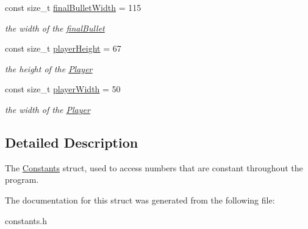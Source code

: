 \begin{DoxyCompactItemize}
\mbox{\label{structConstants_a5f71dc635e410b31e4876e97e46b1c20}} 
const size\+\_\+t \hyperlink{structConstants_a5f71dc635e410b31e4876e97e46b1c20}{final\+Bullet\+Width} = 115
\begin{DoxyCompactList}\small\item\em the width of the \hyperlink{classfinalBullet}{final\+Bullet} \end{DoxyCompactList}\item 
\mbox{\label{structConstants_a9f635dc83697b9a825959384b61cc559}} 
const size\+\_\+t \hyperlink{structConstants_a9f635dc83697b9a825959384b61cc559}{player\+Height} = 67
\begin{DoxyCompactList}\small\item\em the height of the \hyperlink{classPlayer}{Player} \end{DoxyCompactList}\item 
\mbox{\label{structConstants_a9854eedbfb70239ffbd1d12530f301a5}} 
const size\+\_\+t \hyperlink{structConstants_a9854eedbfb70239ffbd1d12530f301a5}{player\+Width} = 50
\begin{DoxyCompactList}\small\item\em the width of the \hyperlink{classPlayer}{Player} \end{DoxyCompactList}\end{DoxyCompactItemize}


\subsection{Detailed Description}
The \hyperlink{structConstants}{Constants} struct, used to access numbers that are constant throughout the program. 

The documentation for this struct was generated from the following file\+:\begin{DoxyCompactItemize}
\item 
constants.\+h\end{DoxyCompactItemize}
